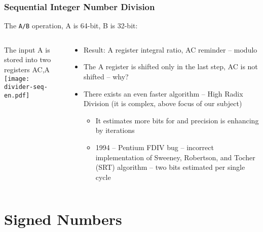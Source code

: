 \documentclass{beamer}
\begin{document}
\begin{frame}
\frametitle{Sequential Integer Number Division}

The \texttt{A/B} operation, A is 64-bit, B is 32-bit:\\
\begin{columns}
\begin{column}{0.45\textwidth}
The input A is stored into two registers AC,A\\
\texttt{[image: divider-seq-en.pdf]}
\end{column}
\hfill
\begin{column}{0.55\textwidth}
\begin{itemize}
\item Result: A register integral ratio, AC reminder -- modulo
\item The A register is shifted only in the last step, AC is not shifted -- why?
\item There exists an even faster algorithm -- High Radix Division (it is complex, above focus of our subject)
\begin{itemize}
\item It estimates more bits for and precision is enhancing by iterations
\item 1994 -- Pentium FDIV bug -- incorrect implementation of Sweeney, Robertson, and Tocher (SRT) algorithm -- two bits estimated per single cycle
\end{itemize}
\end{itemize}
\end{column}
\end{columns}


\end{frame}


\section{Signed Numbers}
\end{document}
